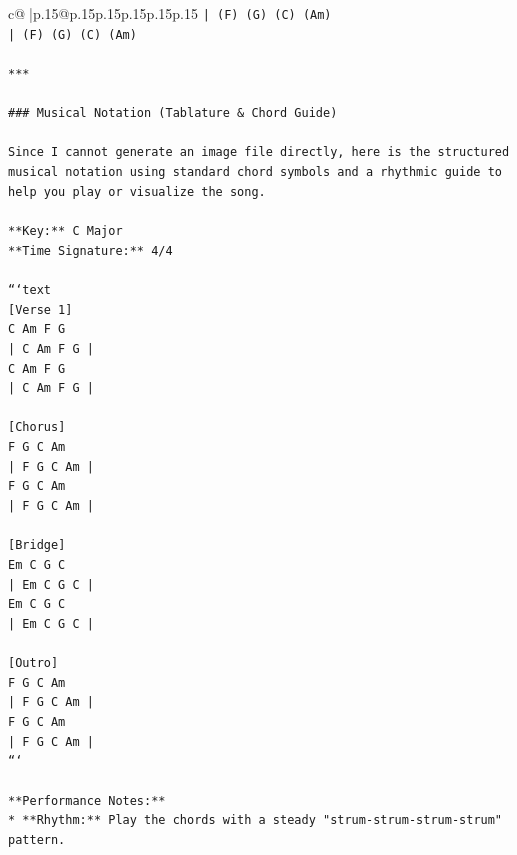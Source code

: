 \documentclass{article}
\begin{document}
{\begin{supertabular}{c@{$\;$}|p{.15\linewidth}@{}p{.15\linewidth}p{.15\linewidth}p{.15\linewidth}p{.15\linewidth}p{.15\linewidth}}
{{{\texttt{| (F) (G) (C) (Am)} \\
\texttt{| (F) (G) (C) (Am)} \\
\\ 
\texttt{***} \\
\\ 
\texttt{\#\#\# Musical Notation (Tablature \& Chord Guide)} \\
\\ 
\texttt{Since I cannot generate an image file directly, here is the structured musical notation using standard chord symbols and a rhythmic guide to help you play or visualize the song.} \\
\\ 
\texttt{**Key:** C Major} \\
\texttt{**Time Signature:** 4/4} \\
\\ 
\texttt{```text} \\
\texttt{{[}Verse 1{]}} \\
\texttt{C  Am  F  G} \\
\texttt{| C  Am  F  G |} \\
\texttt{C  Am  F  G} \\
\texttt{| C  Am  F  G |} \\
\\ 
\texttt{{[}Chorus{]}} \\
\texttt{F  G  C  Am} \\
\texttt{| F  G  C  Am |} \\
\texttt{F  G  C  Am} \\
\texttt{| F  G  C  Am |} \\
\\ 
\texttt{{[}Bridge{]}} \\
\texttt{Em  C  G  C} \\
\texttt{| Em  C  G  C |} \\
\texttt{Em  C  G  C} \\
\texttt{| Em  C  G  C |} \\
\\ 
\texttt{{[}Outro{]}} \\
\texttt{F  G  C  Am} \\
\texttt{| F  G  C  Am |} \\
\texttt{F  G  C  Am} \\
\texttt{| F  G  C  Am |} \\
\texttt{```} \\
\\ 
\texttt{**Performance Notes:**} \\
\texttt{*   **Rhythm:** Play the chords with a steady "strum{-}strum{-}strum{-}strum" pattern.} \\
}}}
\end{supertabular}}
\end{document}
